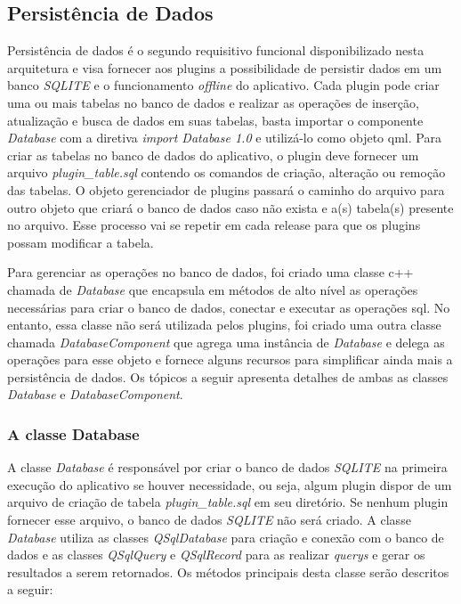 \subsection{Persistência de Dados}\label{sec:solucao-desenvolvida}
Persistência de dados é o segundo requisitivo funcional disponibilizado nesta arquitetura e visa fornecer aos plugins a possibilidade de persistir dados em um banco \textit{SQLITE} e o funcionamento \textit{offline} do aplicativo. Cada plugin pode criar uma ou mais tabelas no banco de dados e realizar as operações de inserção, atualização e busca de dados em suas tabelas, basta importar o componente \textit{Database} com a diretiva \textit{import Database 1.0} e utilizá-lo como objeto qml. Para criar as tabelas no banco de dados do aplicativo, o plugin deve fornecer um arquivo \textit{plugin\_table.sql} contendo os comandos de criação, alteração ou remoção das tabelas. O objeto gerenciador de plugins passará o caminho do arquivo para outro objeto que criará o banco de dados caso não exista e a(s) tabela(s) presente no arquivo. Esse processo vai se repetir em cada release para que os plugins possam modificar a tabela.\par

Para gerenciar as operações no banco de dados, foi criado uma classe c++ chamada de \textit{Database} que encapsula em métodos de alto nível as operações necessárias para criar o banco de dados, conectar e executar as operações sql. No entanto, essa classe não será utilizada pelos plugins, foi criado uma outra classe chamada \textit{DatabaseComponent} que agrega uma instância de \textit{Database} e delega as operações para esse objeto e fornece alguns recursos para simplificar ainda mais a persistência de dados. Os tópicos a seguir apresenta detalhes de ambas as classes \textit{Database} e \textit{DatabaseComponent}.

\subsubsection{A classe Database}\label{sec:solucao-desenvolvida}
A classe \textit{Database} é responsável por criar o banco de dados \textit{SQLITE} na primeira execução do aplicativo se houver necessidade, ou seja, algum plugin dispor de um arquivo de criação de tabela \textit{plugin\_table.sql} em seu diretório. Se nenhum plugin fornecer esse arquivo, o banco de dados \textit{SQLITE} não será criado. A classe \textit{Database} utiliza as classes \textit{QSqlDatabase} para criação e conexão com o banco de dados e as classes \textit{QSqlQuery} e \textit{QSqlRecord} para as realizar \textit{querys} e gerar os resultados a serem retornados. Os métodos principais desta classe serão descritos a seguir:

